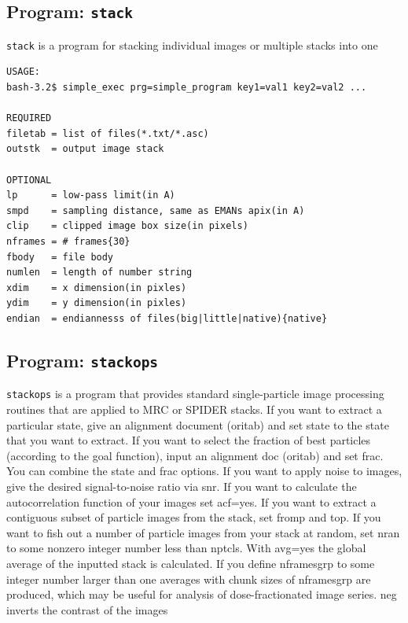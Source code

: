 \documentclass[a4paper,11pt]{article}
\newcommand{\prgname}[1]{\textcolor{NavyBlue}{\texttt{#1}}}
\begin{document}
\subsection{Program: \prgname{stack}}
\label{stack}
\prgname{stack} is a program for stacking individual images or multiple stacks into one

\begin{verbatim}
USAGE:
bash-3.2$ simple_exec prg=simple_program key1=val1 key2=val2 ...

REQUIRED
filetab = list of files(*.txt/*.asc)
outstk  = output image stack

OPTIONAL
lp      = low-pass limit(in A)
smpd    = sampling distance, same as EMANs apix(in A)
clip    = clipped image box size(in pixels)
nframes = # frames{30}
fbody   = file body
numlen  = length of number string
xdim    = x dimension(in pixles)
ydim    = y dimension(in pixles)
endian  = endiannesss of files(big|little|native){native}
\end{verbatim}

\subsection{Program: \prgname{stackops}}
\label{stackops}
\prgname{stackops} is a program that provides standard single-particle image processing routines that are applied to MRC or SPIDER stacks. If you want to extract a particular state, give an alignment document (oritab) and set state to the state that you want to extract. If you want to select the fraction of best particles (according to the goal function), input an alignment doc (oritab) and set frac. You can combine the state and frac options. If you want to apply noise to images, give the desired signal-to-noise ratio via snr. If you want to calculate the autocorrelation function of your images set acf=yes. If you want to extract a contiguous subset of particle images from the stack, set fromp and top. If you want to fish out a number of particle images from your stack at random, set nran to some nonzero integer number less than nptcls. With avg=yes the global average of the inputted stack is calculated. If you define nframesgrp to some integer number larger than one averages with chunk sizes of nframesgrp are produced, which may be useful for analysis of dose-fractionated image series. neg inverts the contrast of the images
\end{document}
